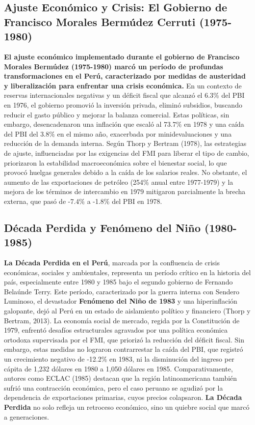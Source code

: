 \documentclass[
  jou,
  floatsintext,
  longtable,
  a4paper,
  nolmodern,
  notxfonts,
  notimes,
  12pt,
  colorlinks=true,linkcolor=blue,citecolor=blue,urlcolor=blue]{apa7}
\begin{document}
\subsection{Ajuste Económico y Crisis: El Gobierno de Francisco Morales
Bermúdez Cerruti
(1975-1980)}\label{ajuste-econuxf3mico-y-crisis-el-gobierno-de-francisco-morales-bermuxfadez-cerruti-1975-1980}

\textbf{El ajuste económico implementado durante el gobierno de
Francisco Morales Bermúdez (1975-1980) marcó un período de profundas
transformaciones en el Perú, caracterizado por medidas de austeridad y
liberalización para enfrentar una crisis económica.} En un contexto de
reservas internacionales negativas y un déficit fiscal que alcanzó el
6.3\% del PBI en 1976, el gobierno promovió la inversión privada,
eliminó subsidios, buscando reducir el gasto público y mejorar la
balanza comercial. Estas políticas, sin embargo, desencadenaron una
inflación que escaló al 73.7\% en 1978 y una caída del PBI del 3.8\% en
el mismo año, exacerbada por minidevaluaciones y una reducción de la
demanda interna. Según Thorp y Bertram (1978), las estrategias de
ajuste, influenciadas por las exigencias del FMI para liberar el tipo de
cambio, priorizaron la estabilidad macroeconómica sobre el bienestar
social, lo que provocó huelgas generales debido a la caída de los
salarios reales. No obstante, el aumento de las exportaciones de
petróleo (254\% anual entre 1977-1979) y la mejora de los términos de
intercambio en 1979 mitigaron parcialmente la brecha externa, que pasó
de -7.4\% a -1.8\% del PBI en 1978.

\subsection{Década Perdida y Fenómeno del Niño
(1980-1985)}\label{duxe9cada-perdida-y-fenuxf3meno-del-niuxf1o-1980-1985}

\textbf{La Década Perdida en el Perú}, marcada por la confluencia de
crisis económicas, sociales y ambientales, representa un período crítico
en la historia del país, especialmente entre 1980 y 1985 bajo el segundo
gobierno de Fernando Belaúnde Terry. Este período, caracterizado por la
guerra interna con Sendero Luminoso, el devastador \textbf{Fenómeno del
Niño de 1983} y una hiperinflación galopante, dejó al Perú en un estado
de aislamiento político y financiero (Thorp y Bertram, 2013). La
economía social de mercado, regida por la Constitución de 1979, enfrentó
desafíos estructurales agravados por una política económica ortodoxa
supervisada por el FMI, que priorizó la reducción del déficit fiscal.
Sin embargo, estas medidas no lograron contrarrestar la caída del PBI,
que registró un crecimiento negativo de -12.2\% en 1983, ni la
disminución del ingreso per cápita de 1,232 dólares en 1980 a 1,050
dólares en 1985. Comparativamente, autores como ECLAC (1985) destacan
que la región latinoamericana también sufrió una contracción económica,
pero el caso peruano se agudizó por la dependencia de exportaciones
primarias, cuyos precios colapsaron. \textbf{La Década Perdida} no solo
refleja un retroceso económico, sino un quiebre social que marcó a
generaciones.
\end{document}
